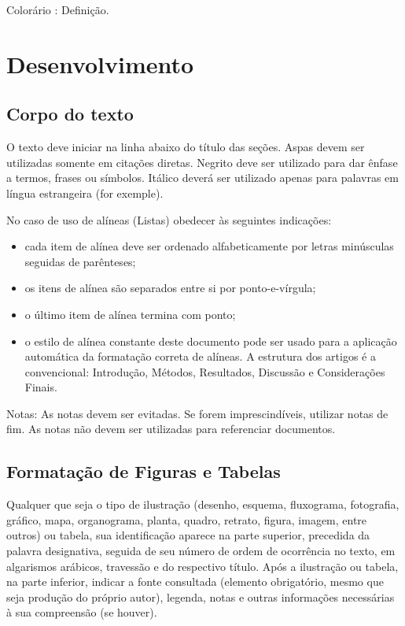 \documentclass[a4,12pt]{modelo}
\begin{document}
\begin{cor}
	\item[Colorário]: Definição.
\end{cor} 
  
 
\section{Desenvolvimento}  

\subsection{Corpo do texto} O texto deve iniciar na linha abaixo do título das seções. 
Aspas devem ser utilizadas somente em citações diretas. Negrito deve ser utilizado para dar ênfase a termos, frases ou símbolos. Itálico deverá ser utilizado apenas para palavras em língua estrangeira (for exemple). 

No caso de uso de alíneas (Listas) obedecer às seguintes indicações: 
\begin{itemize}
\item cada item de alínea deve ser ordenado alfabeticamente por letras minúsculas seguidas de parênteses;
\item os itens de alínea são separados entre si por ponto-e-vírgula;
\item o último item de alínea termina com ponto;
\item 	o estilo de alínea constante deste documento pode ser usado para a aplicação automática da formatação correta de alíneas.
A estrutura dos artigos é a convencional: Introdução, Métodos, Resultados, Discussão e Considerações Finais. 
\end{itemize}  

Notas: As notas devem ser evitadas. Se forem imprescindíveis, utilizar notas de fim. As notas não devem ser utilizadas para referenciar documentos. 

 
\subsection{Formatação de Figuras e Tabelas}  
  
Qualquer que seja o tipo de ilustração (desenho, esquema, fluxograma, fotografia, gráfico, mapa, organograma, planta, quadro, retrato, figura, imagem, entre outros) ou tabela, sua identificação aparece na parte superior, precedida da palavra designativa, seguida de seu número de ordem de ocorrência no texto, em algarismos arábicos, travessão e do respectivo título. Após a ilustração ou tabela, na parte inferior, indicar a fonte consultada (elemento obrigatório, mesmo que seja produção do próprio autor), legenda, notas e outras informações necessárias à sua compreensão (se houver). 
 
\end{document}

